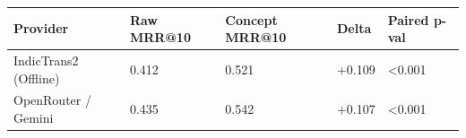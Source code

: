 \begin{tabular}{lllll}
\toprule
Provider & Raw MRR@10 & Concept MRR@10 & Delta & Paired p-val \\
\midrule
IndicTrans2 (Offline) & 0.412 & 0.521 & +0.109 & <0.001 \\
OpenRouter / Gemini & 0.435 & 0.542 & +0.107 & <0.001 \\
\bottomrule
\end{tabular}
